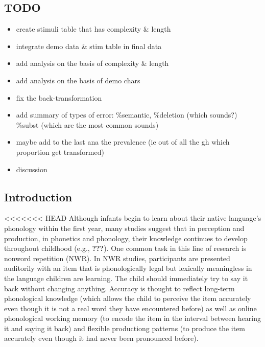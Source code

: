 \documentclass[english,,man,floatsintext]{apa6}
\author{Alejandrina Cristia\textsuperscript{1}\ \& Marisa Casillas\textsuperscript{2}}
\affiliation{
\vspace{0.5cm}
\textsuperscript{1} LSCP, Département d’études cognitives, ENS, EHESS, CNRS, Université PSL\\\textsuperscript{2} Max Planck Institute for Psycholinguistics}
\date{}
\providecommand{\tightlist}{%
  \setlength{\itemsep}{0pt}\setlength{\parskip}{0pt}}
\begin{document}
\hypertarget{todo}{%
\subsection{TODO}\label{todo}}

\begin{itemize}
\tightlist
\item
  create stimuli table that has complexity \& length
\item
  integrate demo data \& stim table in final data
\item
  add analysis on the basis of complexity \& length
\item
  add analysis on the basis of demo chars
\item
  fix the back-transformation
\item
  add summary of types of error: \%semantic, \%deletion (which sounds?) \%subst (which are the most common sounds)
\item
  maybe add to the last ana the prevalence (ie out of all the gh which proportion get transformed)
\item
  discussion
\end{itemize}

\hypertarget{introduction}{%
\subsection{Introduction}\label{introduction}}

<<<<<<< HEAD
Although infants begin to learn about their native language's phonology within the first year, many studies suggest that in perception and production, in phonetics and phonology, their knowledge continues to develop throughout childhood (e.g., {\textbf{???}}). One common task in this line of research is nonword repetition (NWR). In NWR studies, participants are presented auditorily with an item that is phonologically legal but lexically meaningless in the language children are learning. The child should immediately try to say it back without changing anything. Accuracy is thought to reflect long-term phonological knowledge (which allows the child to perceive the item accurately even though it is not a real word they have encountered before) as well as online phonological working memory (to encode the item in the interval between hearing it and saying it back) and flexible productiong patterns (to produce the item accurately even though it had never been pronounced before).
\end{document}
